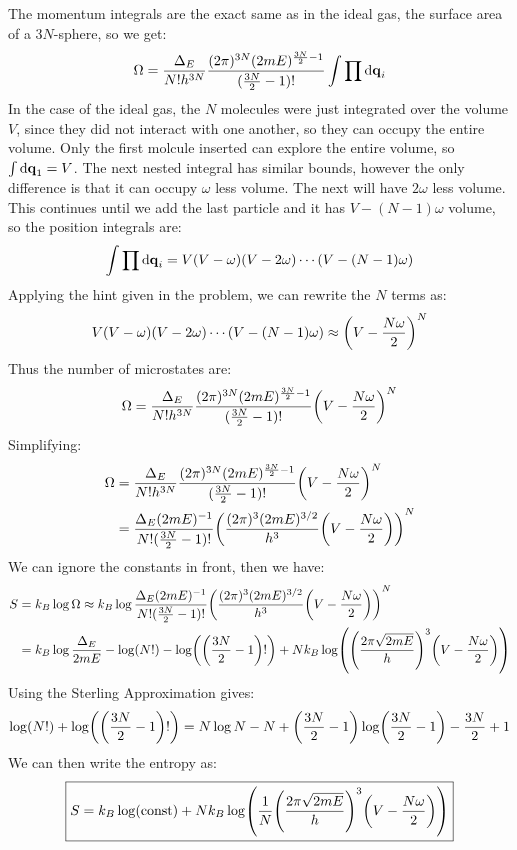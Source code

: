 \documentclass[12pt]{article}
\begin{document}
The momentum integrals are the exact same as in the ideal gas, the surface area of a $3N$-sphere, so we get:
\begin{align*}
  \Omega=\frac{\Delta_E}{N!h^{3N}}
  \frac{(2\pi)^{3N}(2mE)^{\frac{3N}2-1}}{(\frac{3N}{2}-1)!}
  \int\prod\dd{\vb{q}}_i
\end{align*}
In the case of the ideal gas, the $N$ molecules were just integrated over the volume $V$, since they did not interact with one another, so they can occupy the entire volume. Only the first molcule inserted can explore the entire volume, so $\int\dd{\vb{q}}_1=V$. The next nested integral has similar bounds, however the only difference is that it can occupy $\omega$ less volume. The next will have $2\omega$ less volume. This continues until we add the last particle and it has $V-(N-1)\omega$ volume, so the position integrals are:
\begin{align*}
  \int\prod\dd{\vb{q}}_i=V(V-\omega)(V-2\omega)\cdots(V-(N-1)\omega)
\end{align*}
Applying the hint given in the problem, we can rewrite the $N$ terms as:
\begin{align*}
  V(V-\omega)(V-2\omega)\cdots(V-(N-1)\omega)\approx\qty(V-\frac{N\omega}{2})^N
\end{align*}
Thus the number of microstates are:
\begin{align*}
  \Omega=\frac{\Delta_E}{N!h^{3N}}
  \frac{(2\pi)^{3N}(2mE)^{\frac{3N}2-1}}{(\frac{3N}{2}-1)!}
  \qty(V-\frac{N\omega}{2})^N
\end{align*}
Simplifying:
\begin{align*}
  \Omega&=\frac{\Delta_E}{N!h^{3N}}
  \frac{(2\pi)^{3N}(2mE)^{\frac{3N}2-1}}{(\frac{3N}{2}-1)!}
  \qty(V-\frac{N\omega}{2})^N\\
  &=\frac{\Delta_E(2mE)^{-1}}{N!(\frac{3N}{2}-1)!}
  \qty(\frac{(2\pi)^3(2mE)^{3/2}}{h^3}\qty(V-\frac{N\omega}{2}))^N
\end{align*}
We can ignore the constants in front, then we have:
\begin{align*}
  S&=k_B\log\Omega\approx k_B\log\frac{\Delta_E(2mE)^{-1}}{N!(\frac{3N}{2}-1)!}
  \qty(\frac{(2\pi)^3(2mE)^{3/2}}{h^3}\qty(V-\frac{N\omega}{2}))^N\\
  &=k_B\log\frac{\Delta_E}{2mE}
  -\log(N!)-\log(\qty(\frac{3N}{2}-1)!)
  +Nk_B\log(\qty(\frac{2\pi\sqrt{2mE}}h)^3\qty(V-\frac{N\omega}{2}))
\end{align*}
Using the Sterling Approximation gives:
\begin{align*}
  \log(N!)+\log(\qty(\frac{3N}{2}-1)!)=N\log N-N+
  \qty(\frac{3N}{2}-1)\log(\frac{3N}{2}-1)-\frac{3N}{2}+1
\end{align*}
We can then write the entropy as:
\begin{align}
  \boxed{S=k_B\log(\text{const})
    +Nk_B\log(\frac1N\qty(\frac{2\pi\sqrt{2mE}}h)^3\qty(V-\frac{N\omega}{2}))}
\end{align}
\end{document}
